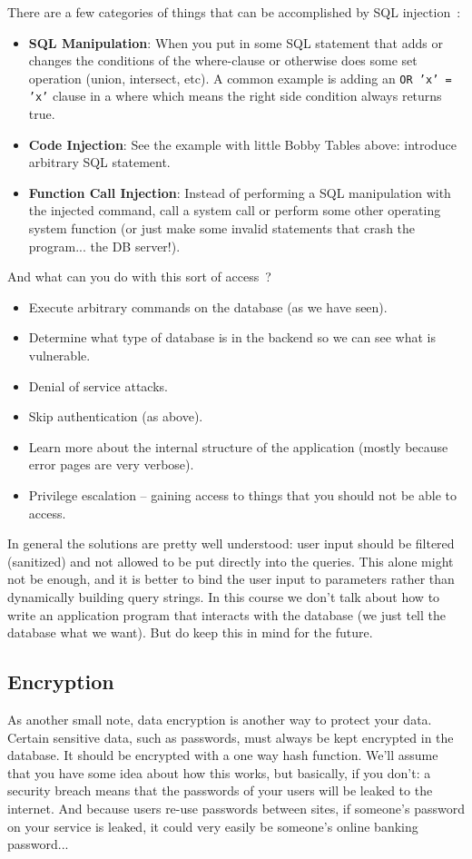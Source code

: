\documentclass[a4paper]{report}
\begin{document}
There are a few categories of things that can be accomplished by SQL injection~\cite{fds}:

\begin{itemize}
	\item \textbf{SQL Manipulation}: When you put in some SQL statement that adds or changes the conditions of the where-clause or otherwise does some set operation (union, intersect, etc). A common example is adding an \texttt{OR 'x' = 'x'} clause in a where which means the right side condition always returns true.
	\item \textbf{Code Injection}: See the example with little Bobby Tables above: introduce arbitrary SQL statement.
	\item \textbf{Function Call Injection}: Instead of performing a SQL manipulation with the injected command, call a system call or perform some other operating system function (or just make some invalid statements that crash the program... the DB server!).
\end{itemize}

And what can you do with this sort of access~\cite{fds}?
\begin{itemize}
	\item Execute arbitrary commands on the database (as we have seen).
	\item Determine what type of database is in the backend so we can see what is vulnerable.
	\item Denial of service attacks.
	\item Skip authentication (as above).
	\item Learn more about the internal structure of the application (mostly because error pages are very verbose).
	\item Privilege escalation -- gaining access to things that you should not be able to access.
\end{itemize}

In general the solutions are pretty well understood: user input should be filtered (sanitized) and not allowed to be put directly into the queries. This alone might not be enough, and it is better to bind the user input to parameters rather than dynamically building query strings. In this course we don't talk about how to write an application program that interacts with the database (we just tell the database what we want). But do keep this in mind for the future.

\subsection*{Encryption}
As another small note, data encryption is another way to protect your data. Certain sensitive data, such as passwords, must always be kept encrypted in the database. It should be encrypted with a one way hash function. We'll assume that you have some idea about how this works, but basically, if you don't: a security breach means that the passwords of your users will be leaked to the internet. And because users re-use passwords between sites, if someone's password on your service is leaked, it could very easily be someone's online banking password...
\end{document}
